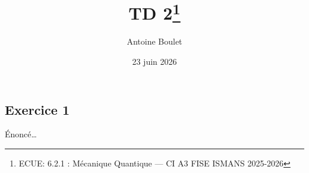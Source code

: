 \documentclass[
  french,
  11pt,
]{article}
\title{TD 2\thanks{ECUE: 6.2.1 : Mécanique Quantique --- CI A3 FISE
ISMANS 2025-2026}}
\author{Antoine Boulet}
\date{23 juin 2026}
\begin{document}
\maketitle


\subsection{Exercice 1}\label{exercice-1}

Énoncé\ldots{}
\end{document}
